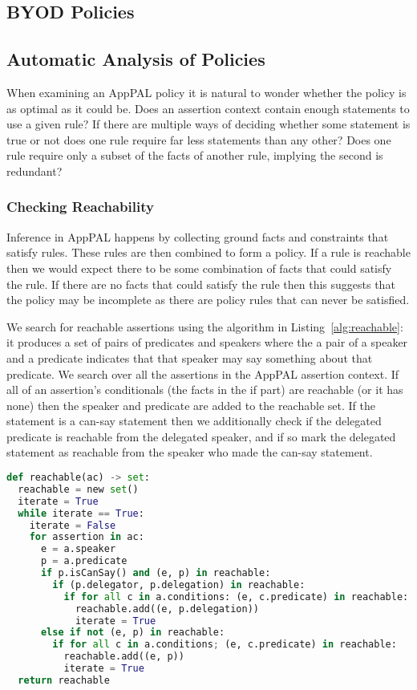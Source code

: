 \documentclass[a4paper]{scrartcl}
\begin{document}
\subsection{BYOD Policies}
\label{sec:byod}

\subsection{Automatic Analysis of Policies}
\label{sec:lint}

When examining an AppPAL policy it is natural to wonder whether the policy is as
optimal as it could be.  Does an assertion context contain enough statements to
use a given rule?  If there are multiple ways of deciding whether some statement
is true or not does one rule require far less statements than any other?  Does
one rule require only a subset of the facts of another rule, implying the second
is redundant?

\subsubsection{Checking Reachability}
Inference in AppPAL happens by collecting ground facts and constraints that satisfy rules.
These rules are then combined to form a policy. 
If a rule is reachable then we would expect there to be some combination of facts that could satisfy the rule.
If there are no facts that could satisfy the rule then this suggests that the policy may be incomplete as there are policy rules that can never be satisfied.  

We search for reachable assertions using the algorithm in Listing~\ref{alg:reachable}:
it produces a set of pairs of predicates and speakers where the a pair of a speaker and a predicate indicates that that speaker may say something about that predicate.
We search over all the assertions in the AppPAL assertion context.
If all of an assertion's conditionals (the facts in the if part) are reachable (or it has none) then the speaker and predicate are added to the reachable set.
If the statement is a can-say statement then we additionally check if the delegated predicate is reachable from the delegated speaker, and if so mark the delegated statement as reachable from the speaker who made the can-say statement.

\begin{lstlisting}[language=Python,float,caption={Procedure for finding all reachable assertions.},label={alg:reachable}]
def reachable(ac) -> set:
  reachable = new set()
  iterate = True
  while iterate == True:
    iterate = False
    for assertion in ac:
      e = a.speaker
      p = a.predicate
      if p.isCanSay() and (e, p) in reachable:
        if (p.delegator, p.delegation) in reachable:
          if for all c in a.conditions: (e, c.predicate) in reachable:
            reachable.add((e, p.delegation))
            iterate = True
      else if not (e, p) in reachable:
        if for all c in a.conditions; (e, c.predicate) in reachable:
          reachable.add((e, p))
          iterate = True
  return reachable
\end{lstlisting}
\end{document}

